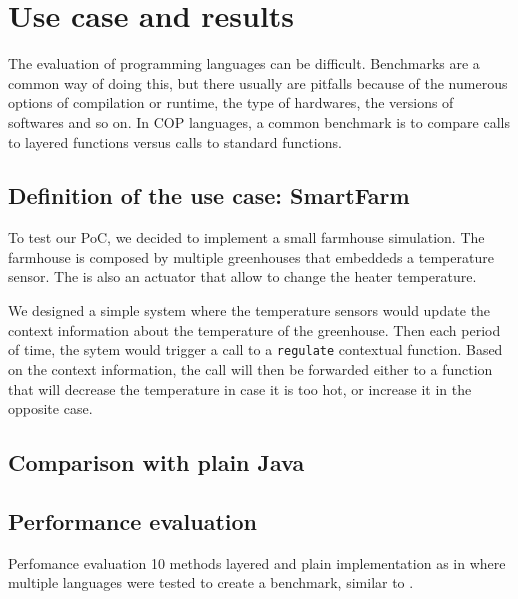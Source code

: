 \documentclass[a4paper]{article}
\begin{document}
\begin{lstlisting}[float, language=Java, caption=Proxy generation - LocalReferenceAssignmentAndVerificationVisitor.java, label={listing:implswitch}]

\end{lstlisting}


\section{Use case and results}
\label{section:results}
The evaluation of programming languages can be difficult. Benchmarks are a common way of doing this, but there usually are pitfalls because of the numerous options of compilation or runtime, the type of hardwares, the versions of softwares and so on. In COP languages, a common benchmark is to compare calls to layered functions versus calls to standard functions.

\subsection{Definition of the use case: SmartFarm}

To test our PoC, we decided to implement a small farmhouse simulation. The farmhouse is composed by multiple greenhouses that embeddeds a temperature sensor. The is also an actuator that allow to change the heater temperature.

We designed a simple system where the temperature sensors would update the context information about the temperature of the greenhouse. Then each period of time, the sytem would trigger a call to a \lstinline|regulate| contextual function. Based on the context information, the call will then be forwarded either to a function that will decrease the temperature in case it is too hot, or increase it in the opposite case.

\subsection{Comparison with plain Java}

\subsection{Performance evaluation}

Perfomance evaluation
10 methods layered and plain implementation as in \cite{appeltauer_comparison_2009} where multiple languages were tested to create a benchmark, similar to \cite{kamina_eventcj:_2011}.
\end{document}
